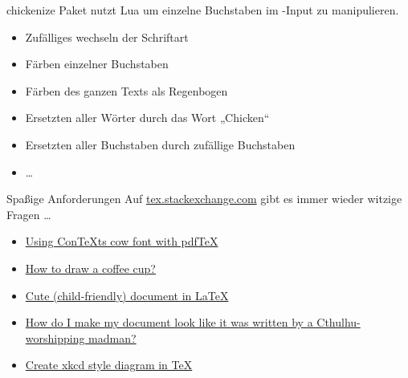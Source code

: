 \documentclass[
	vorläufig=false,
	datum=2016-12-16,
	titel={Witziges und Obskures},
	web=false,
]{../tex/latexkurs-slides}
\begin{document}
\begin{frame}[t]{chickenize}
	Paket  nutzt Lua um einzelne Buchstaben im -Input zu manipulieren.
	
	\begin{itemize}
		\item Zufälliges wechseln der Schriftart
		\item Färben einzelner Buchstaben
		\item Färben des ganzen Texts als Regenbogen
		\item Ersetzten aller Wörter durch das Wort „Chicken“
		\item Ersetzten aller Buchstaben durch zufällige Buchstaben
		\item …
	\end{itemize}
\end{frame}

\begin{frame}{Spaßige Anforderungen}
	Auf \url{tex.stackexchange.com} gibt es immer wieder witzige Fragen …
	\begin{itemize}
		\item \href{http://tex.stackexchange.com/questions/115471/using-contexts-cow-font-with-pdftex}{Using ConTeXts cow font with pdfTeX}
		\item \href{http://tex.stackexchange.com/questions/145223/how-to-draw-a-coffee-cup}{How to draw a coffee cup?}
		\item \href{http://tex.stackexchange.com/questions/63732/cute-child-friendly-document-in-latex}{Cute (child-friendly) document in LaTeX}
		\item \href{http://tex.stackexchange.com/questions/29402/how-do-i-make-my-document-look-like-it-was-written-by-a-cthulhu-worshipping-madm}{How do I make my document look like it was written by a Cthulhu-worshipping madman?}
		\item \href{http://tex.stackexchange.com/questions/74878/create-xkcd-style-diagram-in-tex}{Create xkcd style diagram in TeX}
	\end{itemize}
\end{frame}
\end{document}
